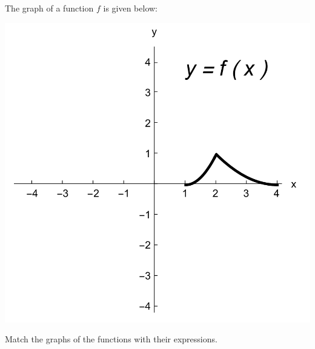 \documentclass{ximera}
\author{Nala Lakos \and Kyle Parsons}
\begin{document}
The graph of a function $f$ is given below:

\begin{image}
\includegraphics{matchingTransGraph1.png}
\end{image}

Match the graphs of the functions with their expressions.
\end{document}

